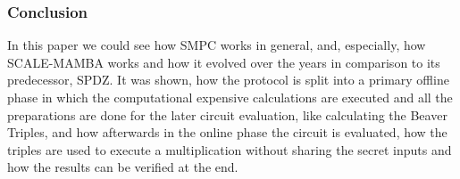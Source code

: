 \documentclass[english,runningheads,a4paper]{llncs}[2018/03/10]
\begin{document}
\subsubsection{Conclusion}

In this paper we could see how SMPC works in general, and, especially, how SCALE-MAMBA works and how it evolved over the years in comparison to its predecessor, SPDZ. It was shown, how the protocol is split into a primary offline phase in which the computational expensive calculations are executed and all the preparations are done for the later circuit evaluation, like calculating the Beaver Triples, and how afterwards in the online phase the circuit is evaluated, how the triples are used to execute a multiplication without sharing the secret inputs and how the results can be verified at the end. 





\renewcommand{\bibsection}{\section*{References}} %

\begingroup
  \ifluatex
  \else
  \fi
  \small %
  
\endgroup

\ \\
%
\end{document}
